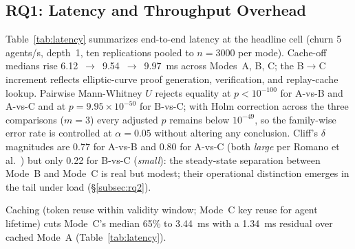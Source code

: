 \documentclass[conference]{IEEEtran}
\begin{document}
\subsection{RQ1: Latency and Throughput Overhead}
\label{subsec:rq1}

Table~\ref{tab:latency} summarizes end-to-end latency at the headline cell (churn 5\,agents/s, depth~1, ten replications pooled to $n=3000$ per mode). Cache-off medians rise 6.12~$\to$~9.54~$\to$~9.97~ms across Modes~A, B, C; the B$\to$C increment reflects elliptic-curve proof generation, verification, and replay-cache lookup. Pairwise Mann-Whitney $U$ rejects equality at $p<10^{-100}$ for A-vs-B and A-vs-C and at $p=9.95\times 10^{-50}$ for B-vs-C; with Holm correction across the three comparisons ($m=3$) every adjusted $p$ remains below $10^{-49}$, so the family-wise error rate is controlled at $\alpha=0.05$ without altering any conclusion. Cliff's $\delta$ magnitudes are 0.77 for A-vs-B and 0.80 for A-vs-C (both \emph{large} per Romano et al.~\cite{romano2006appropriate}) but only 0.22 for B-vs-C (\emph{small}): the steady-state separation between Mode~B and Mode~C is real but modest; their operational distinction emerges in the tail under load (\S\ref{subsec:rq2}).

Caching (token reuse within validity window; Mode~C key reuse for agent lifetime) cuts Mode~C's median 65\% to 3.44~ms with a 1.34~ms residual over cached Mode~A (Table~\ref{tab:latency}).

\begin{table}[htbp]
\caption{End-to-end latency at the headline cell (churn 5/s, depth 1; $n=3000$ cache-off, $n=1500$ cache-on per mode). CI: bootstrap 95\% CI of the median (10\,000 resamples, seed 20260506); per-pair statistics in \texttt{significance\_tests.json}.}
\label{tab:latency}
\centering
{}
\end{table}
\end{document}
